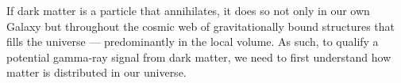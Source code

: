 



If dark matter is a particle that annihilates, it does so not only in our own Galaxy but throughout the cosmic web of gravitationally bound structures that fills the universe --- predominantly in the local volume.
As such, to qualify a potential gamma-ray signal from dark matter, we need to first understand how matter is distributed in our universe.

